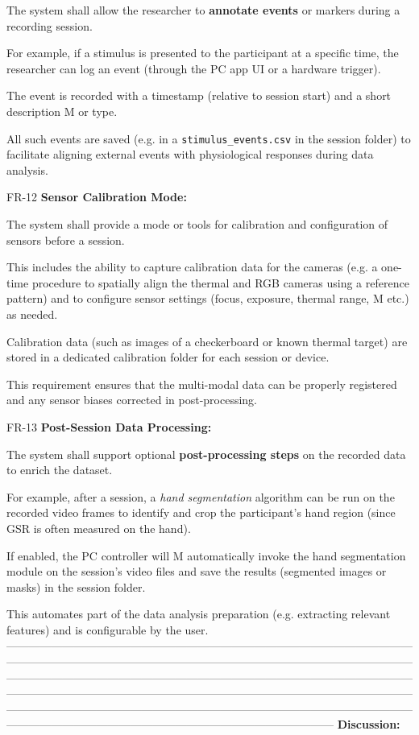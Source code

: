 The system shall allow the researcher to \textbf{annotate events}
 or markers during a recording session.

For example, if a stimulus is presented to the participant at a specific time, the researcher can log an event (through the PC app UI or a hardware trigger).

The event is recorded with a timestamp (relative to session start) and a short description M or type.

All such events are saved (e.g. in a \texttt{stimulus\_events.csv} in the session folder) to facilitate aligning external events with physiological responses during data analysis.

FR-12 \textbf{Sensor Calibration Mode:}

The system shall provide a mode or tools for calibration and configuration of sensors before a session.

This includes the ability to capture calibration data for the cameras (e.g. a one-time procedure to spatially align the thermal and RGB cameras using a reference pattern) and to configure sensor settings (focus, exposure, thermal range, M etc.) as needed.

Calibration data (such as images of a checkerboard or known thermal target) are stored in a dedicated calibration folder for each session or device.

This requirement ensures that the multi-modal data can be properly registered and any sensor biases corrected in post-processing.

FR-13 \textbf{Post-Session Data Processing:}

The system shall support optional \textbf{post-processing steps}
 on the recorded data to enrich the dataset.

For example, after a session, a \textit{hand segmentation} algorithm can be run on the recorded video frames to identify and crop the participant's hand region (since GSR is often measured on the hand).

If enabled, the PC controller will M automatically invoke the hand segmentation module on the session's video files and save the results (segmented images or masks) in the session folder.

This automates part of the data analysis preparation (e.g. extracting relevant features) and is configurable by the user. --------------------------------------------------------------------------------------------------------------------------------------------------------------------------------------------------------------------------------------------------------------------------------------------------------------------------------------------------------------------------------------------------------------------------------------------------------------------------------------------------------------------------------------------------------------------------------------------------------------------------------------------------- \textbf{Discussion:}

